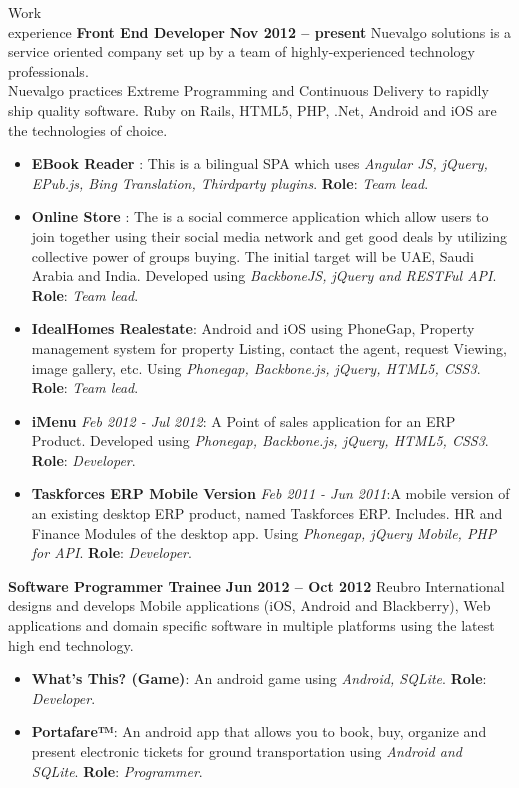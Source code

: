\documentclass{resume}
\begin{document}
\begin{category}{Work \\experience}
  \citemnobullet \textbf{Front End Developer} \hfill \textbf{Nov 2012 -- present}
  \citemnobullet Nuevalgo solutions is a service oriented company set up by a team of highly-experienced technology professionals. \\Nuevalgo practices Extreme Programming and Continuous
  Delivery to rapidly ship quality software. Ruby on Rails, HTML5, PHP, .Net, Android and iOS are the technologies of choice.
  \begin{itemize}
  \item \textbf{EBook Reader} : This is a bilingual SPA which uses {\em Angular JS, jQuery, EPub.js, Bing Translation, Thirdparty plugins}. \textbf{Role}: {\em Team lead}. 
  \item \textbf{Online Store} : The is a social commerce application which allow users to join together using their social media network and get good deals by utilizing collective power of groups buying. The initial target will be UAE, Saudi Arabia and India. Developed using {\em BackboneJS, jQuery and RESTFul API}. \textbf{Role}: {\em Team lead}.
  \item \textbf{IdealHomes Realestate}: Android and iOS using PhoneGap, Property management system for property Listing, contact the agent, request Viewing, image gallery, etc. Using {\em Phonegap, Backbone.js, jQuery, HTML5, CSS3}. \textbf{Role}: {\em Team lead}.
  \item \textbf{iMenu} {\em Feb 2012 - Jul 2012}: A Point of sales application for an ERP Product. Developed using {\em Phonegap, Backbone.js, jQuery, HTML5, CSS3}. \textbf{Role}: {\em Developer}.
  \item \textbf{Taskforces ERP Mobile Version} {\em Feb 2011 - Jun 2011}:A mobile version of an existing desktop ERP product, named Taskforces ERP. Includes. HR and Finance Modules of the desktop app. Using{\em
      Phonegap, jQuery Mobile, PHP for API}. \textbf{Role}: {\em Developer}. 
  \end{itemize}
  \citemnobullet \textbf{Software Programmer Trainee} \hfill \textbf{Jun 2012 -- Oct 2012}
  \citemnobullet Reubro International designs and develops Mobile applications (iOS, Android and Blackberry), Web applications and domain specific software in multiple platforms using the latest high end technology.
  \begin{itemize} 
  \item \textbf{What’s This? (Game)}: An android game using {\em Android, SQLite}. \textbf{Role}: {\em Developer}.
  \item \textbf{Portafare™}:  An android app that allows you to book, buy, organize and present electronic tickets for ground transportation using {\em Android and SQLite}. \textbf{Role}: {\em Programmer}.
  \end{itemize}
\end{category}
\end{document}
